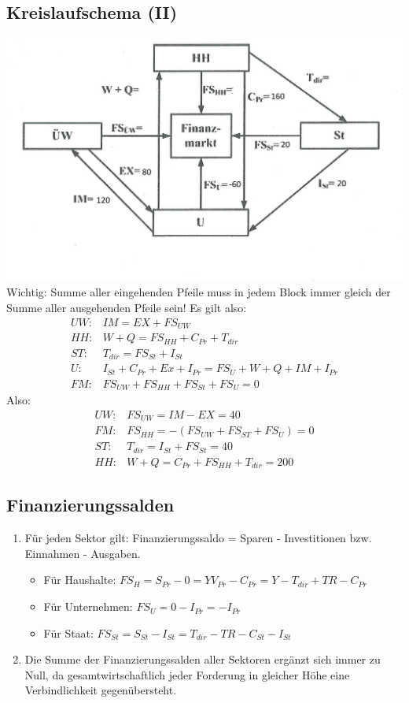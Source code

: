 \documentclass{scrartcl}
\begin{document}
\subsection{Kreislaufschema (II)}
\includegraphics[width=\textwidth]{Bilder/Klassik_Kreislauf_Diagramm_Anschrift.jpg}
Wichtig: Summe aller eingehenden Pfeile muss in jedem Block immer gleich der Summe aller ausgehenden Pfeile sein! Es gilt also:
\begin{align*}
  UW:& IM=EX+FS_{UW}\\
  HH:& W+Q = FS_{HH} + C_{Pr} + T_{dir}\\
  ST:& T_{dir} = FS_{St} + I_{St} \\
  U:& I_{St} + C_{Pr} + Ex + I_{Pr} = FS_{U} + W+Q + IM + I_{Pr}\\
  FM:& FS_{UW} + FS_{HH} + FS_{St} + FS_{U} = 0
\end{align*}
Also:
\begin{align*}
  UW:& FS_{UW} = IM-EX = 40\\
  FM:& FS_{HH} = - (FS_{UW}+FS_{ST}+FS_U) = 0\\
  ST:& T_{dir} = I_{St} + FS_{St} = 40\\
  HH:& W+Q = C_{Pr} + FS_{HH} + T_{dir}  = 200
\end{align*}

\subsection{Finanzierungssalden}
\begin{enumerate}
  \item F\"{u}r jeden Sektor gilt: Finanzierungssaldo = Sparen - Investitionen bzw. Einnahmen - Ausgaben.
  \begin{itemize}
  \item F\"{u}r Haushalte: $FS_H=S_{Pr}-0 = YV_{Pr}-C_{Pr} = Y-T_{dir}+TR-C_{Pr}$
  \item F\"{u}r Unternehmen: $FS_U=0-I_{Pr} = -I_{Pr}$
  \item F\"{u}r Staat: $FS_{St} = S_{St} - I_{St} = T_{dir}-TR - C_{St} - I_{St}$
  \end{itemize}
  \item Die Summe der Finanzierungssalden aller Sektoren erg\"{a}nzt sich immer zu Null, da gesamtwirtschaftlich jeder Forderung in gleicher H\"{o}he eine Verbindlichkeit gegen\"{u}bersteht.
\end{enumerate}
\end{document}

